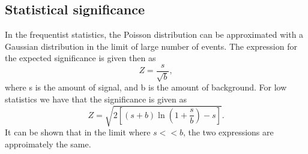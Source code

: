 \subsection*{Statistical significance}
In the frequentist statistics, the Poisson distribution can be approximated with a Gaussian distribution in the limit of large number of events\cite{cowan}. 
The expression for the expected significance is given then as 
\begin{equation}\label{eq:significance_large}
    Z = \frac{s}{\sqrt{b}},
\end{equation}
where s is the amount of signal, and b is the amount of background. For low statistics we have that the significance is given as 
\begin{equation}\label{eq:significance_small}
    Z = \sqrt{2\left[(s+b)\ln(1+\frac{s}{b})-s\right]}.
\end{equation}
It can be shown that in the limit where $s << b$, the two expressions are approimately the same\cite{cowan}.

